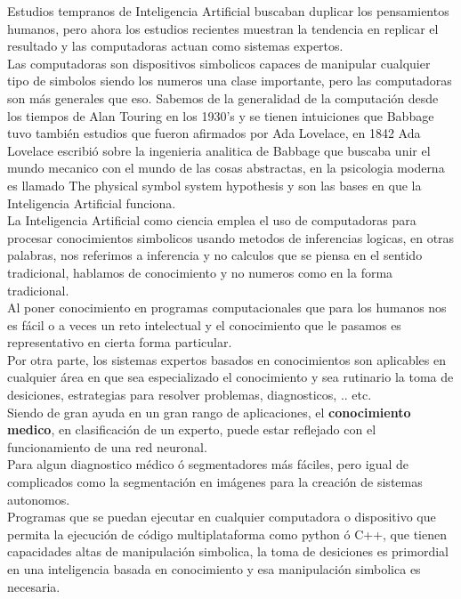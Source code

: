 \documentclass[a4paper, 11pt]{article}
\begin{document}
Estudios tempranos de Inteligencia Artificial buscaban duplicar los pensamientos humanos, pero ahora los estudios recientes muestran la tendencia en replicar el resultado y las computadoras actuan como sistemas expertos.\\

Las computadoras son dispositivos simbolicos capaces de manipular cualquier tipo de simbolos siendo los numeros una clase importante, pero las computadoras son más generales que eso. Sabemos de la generalidad de la computación desde los tiempos de Alan Touring en los 1930's y se tienen intuiciones que Babbage tuvo también estudios que fueron afirmados por Ada Lovelace, en 1842 Ada Lovelace escribió sobre la ingenieria analitica de Babbage que buscaba unir el mundo mecanico con el mundo de las cosas abstractas, en la psicologia moderna es llamado The physical symbol system hypothesis y son las bases en que la Inteligencia Artificial funciona.\\

La Inteligencia Artificial como ciencia emplea el uso de computadoras para procesar conocimientos simbolicos usando metodos de inferencias logicas, en otras palabras, nos referimos a inferencia y no calculos que se piensa en el sentido tradicional, hablamos de conocimiento y no numeros como en la forma tradicional.\\
Al poner conocimiento en programas computacionales que para los humanos nos es fácil o a veces un reto intelectual y el conocimiento que le pasamos es representativo en cierta forma particular.\\

Por otra parte, los sistemas expertos basados en conocimientos son aplicables en cualquier  área en que sea especializado el conocimiento y sea rutinario la toma de desiciones, estrategias para resolver problemas, diagnosticos, .. etc.\\
Siendo de gran ayuda en un gran rango de aplicaciones, el \textbf{conocimiento medico}, en clasificación de un experto, puede estar reflejado con el funcionamiento de una red neuronal.\\

Para algun diagnostico médico ó segmentadores más fáciles, pero igual de complicados como la segmentación en imágenes para la creación de sistemas autonomos.\\

Programas que se puedan ejecutar en cualquier computadora o dispositivo que permita la ejecución de código multiplataforma como python ó C++, que tienen capacidades altas de manipulación simbolica, la toma de desiciones es primordial en una inteligencia basada en conocimiento y esa manipulación simbolica es necesaria.

\pagebreak

\end{document}
